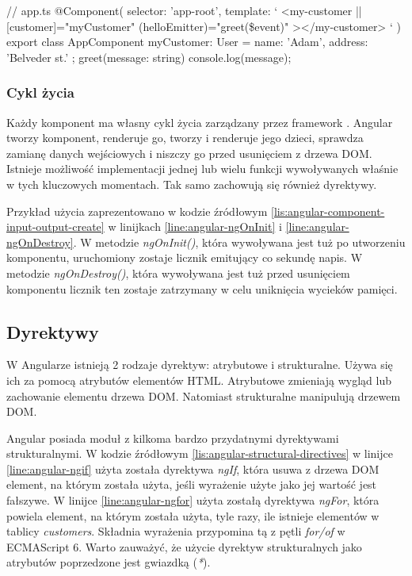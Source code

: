 	\begin{code}[
		language=javascript,
		caption={Użycie komponentu z danymi wejściowymi Angularze (źródło: opracowanie własne)},
		label={lis:angular-component-input-output-use},
		escapechar=|
	]
// app.ts
@Component({
  selector: 'app-root',
  template: `
<my-customer |\label{line:angular-component-element}|
  [customer]="myCustomer"
  (helloEmitter)="greet(\$event)"
></my-customer> 
  `
})
export class AppComponent {
  myCustomer: User = {
    name: 'Adam',
    address: 'Belveder st.'
  };
  greet(message: string) {
    console.log(message);
  }
}
	\end{code}
	
	\subsubsection{Cykl życia}
	Każdy komponent ma własny cykl życia zarządzany przez framework \cite{angular-lifecycle-hooks}. Angular tworzy komponent, renderuje go, tworzy i renderuje jego dzieci, sprawdza zamianę danych wejściowych i niszczy go przed usunięciem z drzewa DOM. Istnieje możliwość implementacji  jednej lub wielu funkcji wywoływanych właśnie w tych kluczowych momentach. Tak samo zachowują się również dyrektywy.\par
	Przykład użycia zaprezentowano w kodzie źródłowym \ref{lis:angular-component-input-output-create} w linijkach \ref{line:angular-ngOnInit} i \ref{line:angular-ngOnDestroy}. W metodzie \textit{ngOnInit()}, która wywoływana jest tuż po utworzeniu komponentu, uruchomiony zostaje licznik emitujący co sekundę napis. W metodzie \textit{ngOnDestroy()}, która wywoływana jest tuż przed usunięciem komponentu licznik ten zostaje zatrzymany w celu uniknięcia wycieków pamięci.
	
	\subsection{Dyrektywy}
	W Angularze istnieją 2 rodzaje dyrektyw: atrybutowe i strukturalne. Używa się ich za pomocą atrybutów elementów HTML. Atrybutowe \cite{angular-attribute-directives} zmieniają wygląd lub zachowanie elementu drzewa DOM.  Natomiast strukturalne \cite{angular-structural-directives} manipulują drzewem DOM.\par
	Angular posiada moduł z kilkoma bardzo przydatnymi dyrektywami strukturalnymi. W kodzie źródłowym \ref{lis:angular-structural-directives} w linijce \ref{line:angular-ngif} użyta została dyrektywa \textit{ngIf}, która usuwa z drzewa DOM element, na którym została użyta, jeśli wyrażenie użyte jako jej wartość jest fałszywe. W linijce \ref{line:angular-ngfor} użyta zostałą dyrektywa \textit{ngFor}, która powiela element, na którym została użyta, tyle razy, ile istnieje elementów w tablicy \textit{customers}. Składnia wyrażenia przypomina tą z pętli \textit{for/of} w ECMAScript 6. Warto zauważyć, że użycie dyrektyw strukturalnych jako atrybutów poprzedzone jest gwiazdką (\textit{*}).
	
